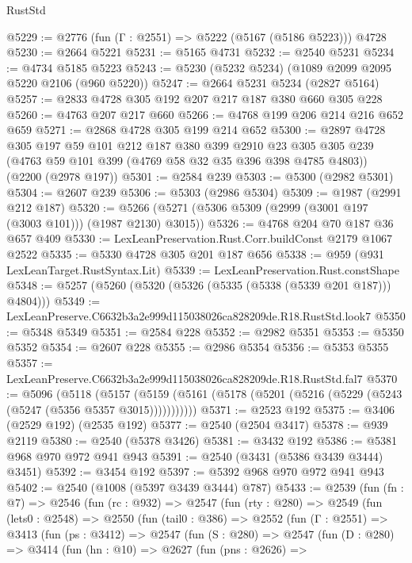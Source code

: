 \begin{lexlean}{RustStd}
\begin{coremodule}
@5229 := @2776 (fun (Γ : @2551) => @5222 (@5167 (@5186 @5223))) @4728
@5230 := @2664 @5221
@5231 := @5165 @4731
@5232 := @2540 @5231
@5234 := @4734 @5185 @5223
@5243 := @5230 (@5232 @5234) (@1089 @2099 @2095 @5220 @2106 (@960 @5220))
@5247 := @2664 @5231 @5234 (@2827 @5164)
@5257 := @2833 @4728 @305 @192 @207 @217 @187 @380 @660 @305 @228
@5260 := @4763 @207 @217 @660
@5266 := @4768 @199 @206 @214 @216 @652 @659
@5271 := @2868 @4728 @305 @199 @214 @652
@5300 := @2897
    @4728
    @305
    @197
    @59
    @101
    @212
    @187
    @380
    @399
    @2910
    @23
    @305
    @305
    @239
    (@4763 @59 @101 @399 (@4769 @58 @32 @35 @396 @398 @4785 @4803))
    (@2200 (@2978 @197))
@5301 := @2584 @239
@5303 := @5300 (@2982 @5301)
@5304 := @2607 @239
@5306 := @5303 (@2986 @5304)
@5309 := @1987 (@2991 @212 @187)
@5320 := @5266 (@5271 (@5306 @5309 (@2999 (@3001 @197 (@3003 @101))) (@1987 @2130) @3015))
@5326 := @4768 @204 @70 @187 @36 @657 @409
@5330 := LexLeanPreservation.Rust.Corr.buildConst @2179 @1067 @2522
@5335 := @5330 @4728 @305 @201 @187 @656
@5338 := @959 (@931 LexLeanTarget.RustSyntax.Lit)
@5339 := LexLeanPreservation.Rust.constShape
@5348 := @5257 (@5260 (@5320 (@5326 (@5335 (@5338 (@5339 @201 @187))) @4804)))
@5349 := LexLeanPreserve.C6632b3a2e999d115038026ca828209de.R18.RustStd.look7
@5350 := @5348 @5349
@5351 := @2584 @228
@5352 := @2982 @5351
@5353 := @5350 @5352
@5354 := @2607 @228
@5355 := @2986 @5354
@5356 := @5353 @5355
@5357 := LexLeanPreserve.C6632b3a2e999d115038026ca828209de.R18.RustStd.fal7
@5370 := @5096
    (@5118
      (@5157 (@5159 (@5161 (@5178 (@5201 (@5216 (@5229 (@5243 (@5247 (@5356 @5357 @3015)))))))))))
@5371 := @2523 @192
@5375 := @3406 (@2529 @192) (@2535 @192)
@5377 := @2540 (@2504 @3417)
@5378 := @939 @2119
@5380 := @2540 (@5378 @3426)
@5381 := @3432 @192
@5386 := @5381 @968 @970 @972 @941 @943
@5391 := @2540 (@3431 (@5386 @3439 @3444) @3451)
@5392 := @3454 @192
@5397 := @5392 @968 @970 @972 @941 @943
@5402 := @2540 (@1008 (@5397 @3439 @3444) @787)
@5433 := @2539
    (fun (fn : @7) =>
    @2546
      (fun (rc : @932) =>
      @2547
        (fun (rty : @280) =>
        @2549
          (fun (lets0 : @2548) =>
          @2550
            (fun (tail0 : @386) =>
            @2552
              (fun (Γ : @2551) =>
              @3413
                (fun (ps : @3412) =>
                @2547
                  (fun (S : @280) =>
                  @2547
                    (fun (D : @280) =>
                    @3414
                      (fun (hn : @10) =>
                      @2627
                        (fun (pns : @2626) =>

\end{coremodule}
\end{lexlean}
